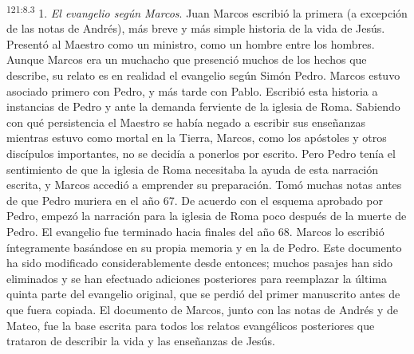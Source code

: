 \par 
\textsuperscript{121:8.3} 1. \textit{El evangelio según Marcos}. Juan Marcos escribió la primera (a excepción de las notas de Andrés), más breve y más simple historia de la vida de Jesús. Presentó al Maestro como un ministro, como un hombre entre los hombres. Aunque Marcos era un muchacho que presenció muchos de los hechos que describe, su relato es en realidad el evangelio según Simón Pedro. Marcos estuvo asociado primero con Pedro, y más tarde con Pablo. Escribió esta historia a instancias de Pedro y ante la demanda ferviente de la iglesia de Roma. Sabiendo con qué persistencia el Maestro se había negado a escribir sus enseñanzas mientras estuvo como mortal en la Tierra, Marcos, como los apóstoles y otros discípulos importantes, no se decidía a ponerlos por escrito. Pero Pedro tenía el sentimiento de que la iglesia de Roma necesitaba la ayuda de esta narración escrita, y Marcos accedió a emprender su preparación. Tomó muchas notas antes de que Pedro muriera en el año 67. De acuerdo con el esquema aprobado por Pedro, empezó la narración para la iglesia de Roma poco después de la muerte de Pedro. El evangelio fue terminado hacia finales del año 68. Marcos lo escribió íntegramente basándose en su propia memoria y en la de Pedro. Este documento ha sido modificado considerablemente desde entonces; muchos pasajes han sido eliminados y se han efectuado adiciones posteriores para reemplazar la última quinta parte del evangelio original, que se perdió del primer manuscrito antes de que fuera copiada. El documento de Marcos, junto con las notas de Andrés y de Mateo, fue la base escrita para todos los relatos evangélicos posteriores que trataron de describir la vida y las enseñanzas de Jesús.

